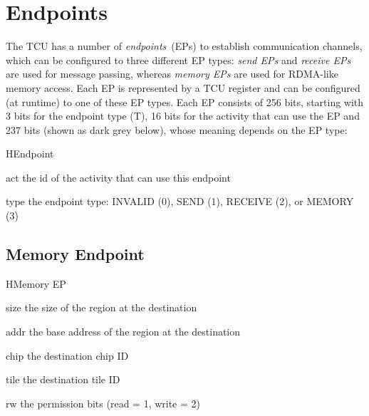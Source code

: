 \chapter{Endpoints}

The TCU has a number of \emph{endpoints}~(EPs) to establish communication channels, which can be
configured to three different EP types: \emph{send EPs} and \emph{receive EPs} are used for message
passing, whereas \emph{memory EPs} are used for RDMA-like memory access. Each EP is represented by a
TCU register and can be configured (at runtime) to one of these EP types. Each EP consists of 256
bits, starting with 3 bits for the endpoint type (T), 16 bits for the activity that can use the EP and
237 bits (shown as dark grey below), whose meaning depends on the EP type:\\[.1em]

\begin{register}{H}{Endpoint}{}
  \regnewline%
  \regnewline%
  \regnewline%
  \regnewline%
  \begin{regdesc}\begin{reglist}
    \item[act]  the id of the activity that can use this endpoint \extend{}
    \item[type] the endpoint type: INVALID (0), SEND (1), RECEIVE (2), or MEMORY (3)
  \end{reglist}\end{regdesc}
\end{register}

\section{Memory Endpoint}

\begin{register}{H}{Memory EP}{}
  \regnewline%
  \regnewline%
  \regnewline%
  \regnewline%
  \begin{regdesc}\begin{reglist}
    \item[size] the size of the region at the destination
    \item[addr] the base address of the region at the destination
    \item[chip] the destination chip ID
    \item[tile] the destination tile ID
    \item[rw] the permission bits (read = 1, write = 2)
  \end{reglist}\end{regdesc}
\end{register}

